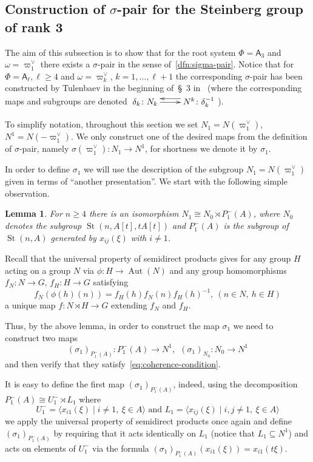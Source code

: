 \documentclass[oneside, 10pt]{amsart}
\DeclareMathOperator{\St}{St}
\DeclareMathOperator{\Aut}{Aut}
\newcommand{\rA}{\mathsf{A}}
\numberwithin{equation}{section}
\newtheorem{lemma}{Lemma}
\numberwithin{lemma}{section}
\theoremstyle{definition}
\theoremstyle{remark}
\begin{document}
\subsection{Construction of \texorpdfstring{$\sigma$}{sigma}-pair for the Steinberg group of rank 3}
The aim of this subsection is to show that for the root system $\Phi=\rA_3$ and $\omega = \varpi_1^\vee$
 there exists a $\sigma$-pair in the sense of~\cref{dfn:sigma-pair}.
Notice that for $\Phi = \rA_\ell, \ell \geq 4$ and $\omega=\varpi_k^\vee$, $k=1,\ldots,\ell+1$ 
the corresponding $\sigma$-pair has been constructed by Tulenbaev in the beginning of~\S~3 in~\cite{Tu83} 
 (where the corresponding maps and subgroups are denoted $\xymatrix{\delta_k \ar[r] \colon N_k & \ar@<-1.0ex>[l] N^k \colon \delta_k^{-1}}$).

To simplify notation, throughout this section we set $N_1 = N(\varpi_1^\vee)$, $N^1 = N(-\varpi_1^\vee)$.
We only construct one of the desired maps from the definition of $\sigma$-pair, namely $\sigma(\varpi_1^\vee) \colon N_1 \to N^1$,
 for shortness we denote it by $\sigma_1$.
 
In order to define $\sigma_1$ we will use the description of the subgroup $N_1 = N(\varpi_1^\vee)$ given in terms of ``another presentation''.
We start with the following simple observation.
\begin{lemma} \label{lem:n1-decomp} For $n\geq 4$ there is an isomorphism $N_1 \cong N_{0} \rtimes P_1^-(A)$, 
 where $N_{0}$ denotes the subgroup $\St(n, A[t], tA[t])$ and $P_1^-(A)$ is the subgroup of $\St(n, A)$ generated by $x_{ij}(\xi)$ with $i\neq 1$.
\end{lemma}

Recall that the universal property of semidirect products gives for any group $H$ acting on a group $N$ via $\phi \colon H \to \Aut(N)$ 
and any group homomorphisms $f_N\colon N \to G$, $f_H\colon H \to G$ satisfying 
\begin{equation} \label{eq:coherence-condition} f_N(\phi(h)(n)) = f_H(h) f_N(n) f_H(h)^{-1},\ (n\in N,\ h\in H) \end{equation} 
a unique map $f\colon N \rtimes H \to G$ extending $f_N$ and $f_H$.

Thus, by the above lemma, in order to construct the map $\sigma_1$ we need to construct two maps 
\[ (\sigma_1)_{P_1^-(A)} \colon P_1^-(A) \to N^1, \ \ (\sigma_1)_{N_{0}} \colon N_{0} \to N^1\]
and then verify that they satisfy~\eqref{eq:coherence-condition}.

It is easy to define the first map $(\sigma_1)_{P_1^-(A)}$, indeed, using the decomposition $P_1^-(A) \cong U^-_1 \rtimes L_1$ where %
\[U^-_1 = \langle x_{i1}(\xi) \mid i\neq 1,\ \xi\in A \rangle \text{ and } L_1 = \langle x_{ij}(\xi) \mid i,  j \neq 1,\ \xi\in A\rangle \]
we apply the universal property of semidirect products once again 
and define $(\sigma_1)_{P_1^-(A)}$ by requiring that it acts identically on $L_1$ (notice that $L_1 \subseteq N^1$) %
and acts on elements of $U^-_1$ via the formula $(\sigma_1)_{P_1^-(A)}(x_{i1}(\xi))= x_{i1}(t\xi)$.
\end{document}
